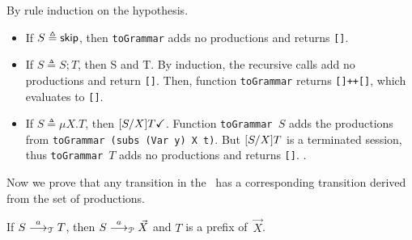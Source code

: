 \begin{itemizeproof}
  By rule induction  on the hypothesis.
  \begin{itemize}
  \item If $S\triangleq \mathsf{skip}$, then \lstinline{toGrammar} adds no
    productions and returns \lstinline{[]}.
  \item If $S\triangleq S;T$, then \DONE S and \DONE T. By induction,
    the recursive calls add no productions and return
    \lstinline|[]|. Then, function \lstinline|toGrammar| returns
    \lstinline|[]++[]|, which evaluates to \lstinline|[]|.
  \item If $S\triangleq \mu X. T$, then
    $[{S}/{X}]T \checkmark$.
    Function \lstinline|toGrammar |$S$ adds the productions from
    \lstinline|toGrammar (subs (Var y) X t)|. But $[{S}/{X}] T$ is a
    terminated session, thus \lstinline{toGrammar }$T$ adds no
    productions and returns \lstinline{[]}. .
  \end{itemize}
\end{itemizeproof}

Now we prove that any transition in the \LTS\ has a
corresponding transition derived from the set of productions.

\begin{lemma}
  If $S \stackrel{a}{\longrightarrow}_\mathcal T T$, then 
  $S \stackrel{a}{\longrightarrow}_\mathcal P \vec X$ and  $T$ is a
  prefix of~$\vec X$.
%
\end{lemma}

